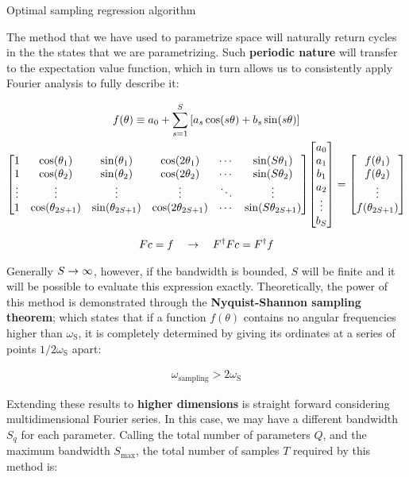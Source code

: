 \documentclass[9pt, handout, aspectratio=169]{beamer}	%
\begin{document}
\begin{frame}[allowframebreaks]{Optimal sampling regression algorithm}

	The method that we have used to parametrize space will naturally return cycles in the the states that we are parametrizing. Such \textbf{periodic nature} will transfer to the expectation value function, which in turn allows us to consistently apply Fourier analysis to fully describe it:

	\begin{gather*}
	  f(\theta) \equiv a_0 + \sum_{s=1}^S \qty[a_s\cos(s\theta) + b_s\sin(s\theta)] \\
	  \mqty[
	    1 & \cos(\theta_1) & \sin(\theta_1) & \cos(2\theta_1)
	      & \cdots & \sin(S\theta_1) \\
	    1 & \cos(\theta_2) & \sin(\theta_2) & \cos(2\theta_2)
	      & \cdots & \sin(S\theta_2) \\
	    \vdots & \vdots & \vdots & \vdots & \ddots & \vdots \\
	    1 & \cos(\theta_{2S+1}) & \sin(\theta_{2S+1}) & \cos(2\theta_{2S+1})
	      & \cdots & \sin(S\theta_{2S+1})
	  ]
	  \mqty[
	    a_0 \\ a_1 \\ b_1 \\ a_2 \\ \vdots \\ b_S
	  ] =
	  \mqty[
	    f(\theta_1) \\ f(\theta_2) \\ \vdots \\ f(\theta_{2S+1})
	  ] \\[5pt]
	  Fc = f \qra F^{\dagger}Fc = F^{\dagger}f
	\end{gather*}

\break

	Generally $S \rightarrow \infty$, however, if the bandwidth is bounded, $S$ will be finite and it will be possible to evaluate this expression exactly. Theoretically, the power of this method is demonstrated through the \textbf{Nyquist-Shannon sampling theorem}; which states that if a function $f(\theta)$ contains no angular frequencies higher than $\omega_{\text{S}}$, it is completely determined by giving its ordinates at a series of points $1/2\omega_{\text{S}}$ apart:

	\begin{gather*}
	  \omega_{\text{sampling}} > 2\omega_{\text{S}}
	\end{gather*}

	Extending these results to \textbf{higher dimensions} is straight forward considering multidimensional Fourier series. In this case, we may have a different bandwidth $S_{q}$ for each parameter. Calling the total number of parameters $Q$, and the maximum bandwidth $S_{\text{max}}$, the total number of samples $T$ required by this method is:


\end{frame}
\end{document}
